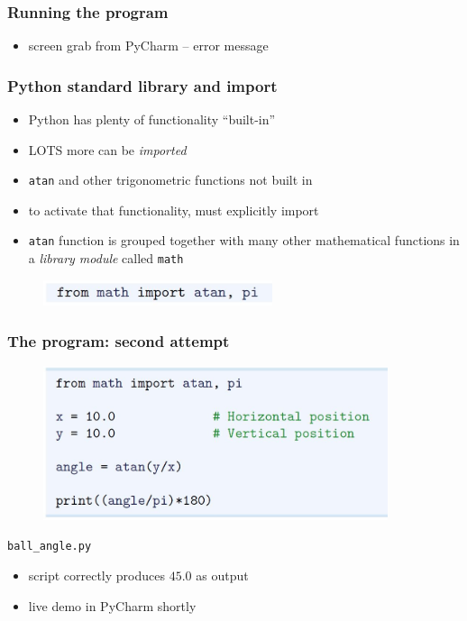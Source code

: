 \documentclass[14pt]{beamer}
\newcommand\red[1]{{\color{red} #1}}
\begin{document}
\begin{frame}[fragile]
\frametitle{Running the program}
\begin{itemize}
\item screen grab from PyCharm -- error message
\end{itemize}
\end{frame}


\begin{frame}[fragile]
\frametitle{Python standard library and import}
\begin{itemize}
\item Python has plenty of functionality ``built-in''
\item LOTS more can be \red{\emph{imported}}
\item \texttt{atan} and other trigonometric functions not built in
\item to activate that functionality, must explicitly import
\item \texttt{atan} function is grouped together with many other mathematical functions in a \red{\emph{library module}}  called \texttt{math}
\end{itemize}

\begin{figure}[ht]
	\centering
	\includegraphics[width=0.6\textwidth]{figures/LLp13a}
\end{figure}

\end{frame}


\begin{frame}[fragile]
\frametitle{The program: second attempt}

\begin{figure}[ht]
	\centering
	\includegraphics[width=0.9\textwidth]{figures/LLp13b}
\end{figure}
\begin{center}
\texttt{ball\_angle.py}
\end{center}
\begin{itemize}
\item script correctly produces $45.0$ as output
\item live demo in PyCharm shortly
\end{itemize}

\end{frame}
\end{document}
